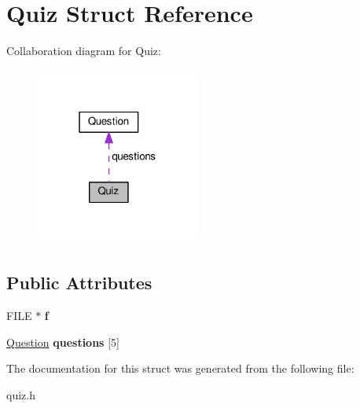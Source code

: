 \hypertarget{structQuiz}{}\section{Quiz Struct Reference}
\label{structQuiz}


Collaboration diagram for Quiz\+:
\nopagebreak
\begin{figure}[H]
\begin{center}
\leavevmode
\includegraphics[width=154pt]{structQuiz__coll__graph}
\end{center}
\end{figure}
\subsection*{Public Attributes}
\begin{DoxyCompactItemize}
\item 
F\+I\+LE $\ast$ {\bfseries f}\hypertarget{structQuiz_a6814ab49dfb839fd4c22a94400875608}{}\label{structQuiz_a6814ab49dfb839fd4c22a94400875608}

\item 
\hyperlink{structQuestion}{Question} {\bfseries questions} \mbox{[}5\mbox{]}\hypertarget{structQuiz_a3f0c3d3814be22e2dec49ccab712eaad}{}\label{structQuiz_a3f0c3d3814be22e2dec49ccab712eaad}

\end{DoxyCompactItemize}


The documentation for this struct was generated from the following file\+:\begin{DoxyCompactItemize}
\item 
quiz.\+h\end{DoxyCompactItemize}
